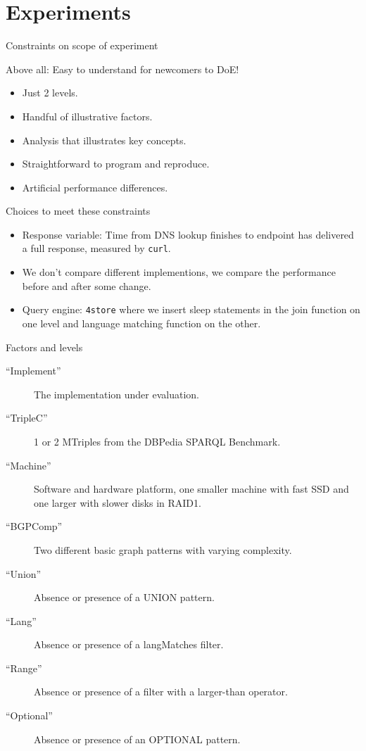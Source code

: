 \documentclass[english,usenames,dvipsnames,aspectratio=169]{beamer}
\begin{document}

\section{Experiments}

\begin{frame}{Constraints on scope of experiment}

Above all: Easy to understand for newcomers to DoE!

\begin{itemize}
\item Just 2 levels.
\item Handful of illustrative factors.
\item Analysis that illustrates key concepts.
\item Straightforward to program and reproduce.
\item Artificial performance differences.
\end{itemize}

\end{frame}

\begin{frame}{Choices to meet these constraints}

  \begin{itemize}
  \item Response variable: Time from DNS lookup finishes to endpoint
    has delivered a full response, measured by \texttt{curl}.
  \item We don't compare different implementions, we compare the
    performance before and after some change.
  \item Query engine: \texttt{4store} where we insert \textsf{sleep}
    statements in the join function on one level and language matching
    function on the other. 
  \end{itemize}

\end{frame}


\begin{frame}{Factors and levels}
  \begin{description}
  \item [``Implement''] The implementation under evaluation.
  \item [``TripleC''] 1 or 2 MTriples from the DBPedia SPARQL
    Benchmark.
  \item [``Machine''] Software and hardware platform, one smaller
    machine with fast SSD and one larger with slower disks in RAID1.
  \item [``BGPComp''] Two different basic graph patterns with varying
    complexity.
  \item [``Union''] Absence or presence of a \textsf{UNION} pattern.
  \item [``Lang''] Absence or presence of a \textsf{langMatches}
    filter.
  \item [``Range''] Absence or presence of a filter with a larger-than
    operator.
  \item [``Optional''] Absence or presence of an \textsf{OPTIONAL}
    pattern.

  \end{description}
\end{frame}
\end{document}
